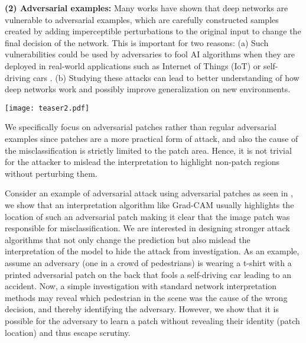 \documentclass[10pt,twocolumn,letterpaper]{article}
\begin{document}
{\bf (2) Adversarial examples:} Many works have shown that deep networks are vulnerable to adversarial examples, which are carefully constructed samples created by adding imperceptible perturbations to the original input to change the final decision of the network. This is important for two reasons: (a) Such vulnerabilities could be used by adversaries to fool AI algorithms when they are deployed in real-world applications such as Internet of Things (IoT) \cite{mosenia2017comprehensive} or self-driving cars \cite{sitawarin2018darts}. (b) Studying these attacks can lead to better understanding of how deep networks work and possibly improve generalization on new environments.

\begin{figure*}[!t]
  \begin{center}
\texttt{[image: teaser2.pdf]}
  \caption{We show that Grad-CAM highlights the patch location in the image perturbed by regular targeted adversarial patches \cite{brown2017adversarial} (top row). Our modified attack algorithm goes beyond fooling the final prediction by hiding the patch in the Grad-CAM visualization, making it difficult to investigate the cause of the mistake. Note that Grad-CAM visualizes the cause of target category.}
  \end{center}
\label{teaser}
\end{figure*}

We specifically focus on adversarial patches rather than regular adversarial examples since patches are a more practical form of attack, and also the cause of the misclassification is strictly limited to the patch area. Hence, it is not trivial for the attacker to mislead the interpretation to highlight non-patch regions without perturbing them.



Consider an example of adversarial attack using adversarial patches as seen in \cite{brown2017adversarial}, we show that an interpretation algorithm like Grad-CAM \cite{selvaraju2016grad} usually highlights the location of such an adversarial patch making it clear that the image patch was responsible for misclassification. We are interested in designing stronger attack algorithms that not only change the prediction but also mislead the interpretation of the model to hide the attack from investigation. As an example, assume an adversary (one in a crowd of pedestrians) is wearing a t-shirt with a printed adversarial patch on the back that fools a self-driving car leading to an accident. Now, a simple investigation with standard network interpretation methods may reveal which pedestrian in the scene was the cause of the wrong decision, and thereby identifying the adversary. However, we show that it is possible for the adversary to learn a patch without revealing their identity (patch location) and thus escape scrutiny.
\end{document}
